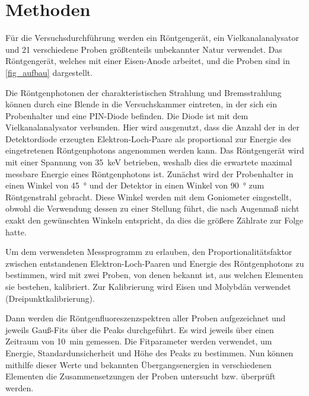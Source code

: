 \documentclass[
	a4paper,
	12pt,
	pagesize,
	ngerman
]{scrartcl}
\begin{document}
	
	\section{Methoden}
	Für die Versuchsdurchführung werden ein Röntgengerät, ein Vielkanalanalysator und 21 verschiedene Proben größtenteils unbekannter Natur verwendet.
	Das Röntgengerät, welches mit einer Eisen-Anode arbeitet, und die Proben sind in \cref{fig_aufbau} dargestellt.
	
	Die Röntgenphotonen der charakteristischen Strahlung und Bremsstrahlung können durch eine Blende in die Versuchskammer eintreten, in der sich ein Probenhalter und eine PIN-Diode befinden.
	Die Diode ist mit dem Vielkanalanalysator verbunden.
	Hier wird ausgenutzt, dass die Anzahl der in der Detektordiode erzeugten Elektron-Loch-Paare als proportional zur Energie des eingetretenen Röntgenphotons angenommen werden kann.
	Das Röntgengerät wird mit einer Spannung von \SI{35}{\kilo \electronvolt} betrieben, weshalb dies die erwartete maximal messbare Energie eines Röntgenphotons ist.
	Zunächst wird der Probenhalter in einen Winkel von \SI{45}{\degree} und der Detektor in einen Winkel von \SI{90}{\degree} zum Röntgenstrahl gebracht.
	Diese Winkel werden mit dem Goniometer eingestellt, obwohl die Verwendung dessen zu einer Stellung führt, die nach Augenmaß nicht exakt den gewünschten Winkeln entspricht, da dies die größere Zählrate zur Folge hatte.
	
	Um dem verwendeten Messprogramm zu erlauben, den Proportionalitätsfaktor zwischen entstandenen Elektron-Loch-Paaren und Energie des Röntgenphotons zu bestimmen, wird mit zwei Proben, von denen bekannt ist, aus welchen Elementen sie bestehen, kalibriert.
	Zur Kalibrierung wird Eisen und Molybdän verwendet (Dreipunktkalibrierung).
	
	Dann werden die Röntgenfluoreszenzspektren aller Proben aufgezeichnet und jeweils Gauß-Fits über die Peaks durchgeführt.
	Es wird jeweils über einen Zeitraum von \SI{10}{\minute} gemessen.
	Die Fitparameter werden verwendet, um Energie, Standardunsicherheit und Höhe des Peaks zu bestimmen.
	Nun können mithilfe dieser Werte und bekannten Übergangsenergien in verschiedenen Elementen die Zusammensetzungen der Proben untersucht bzw. überprüft werden.
	
\end{document}
